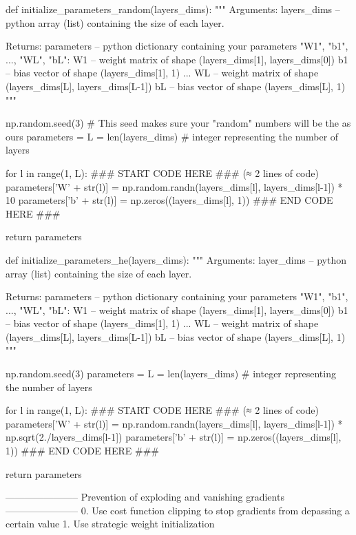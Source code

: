 \documentclass[11pt, onecolumn]{article}
\begin{document}
def initialize_parameters_random(layers_dims):
    """
    Arguments:
    layers_dims -- python array (list) containing the size of each layer.
    
    Returns:
    parameters -- python dictionary containing your parameters "W1", "b1", ..., "WL", "bL":
                    W1 -- weight matrix of shape (layers_dims[1], layers_dims[0])
                    b1 -- bias vector of shape (layers_dims[1], 1)
                    ...
                    WL -- weight matrix of shape (layers_dims[L], layers_dims[L-1])
                    bL -- bias vector of shape (layers_dims[L], 1)
    """
    
    np.random.seed(3)               # This seed makes sure your "random" numbers will be the as ours
    parameters = {}
    L = len(layers_dims)            # integer representing the number of layers
    
    for l in range(1, L):
        ### START CODE HERE ### (≈ 2 lines of code)
        parameters['W' + str(l)] = np.random.randn(layers_dims[l], layers_dims[l-1]) * 10
        parameters['b' + str(l)] = np.zeros((layers_dims[l], 1))
        ### END CODE HERE ###

    return parameters
    
def initialize_parameters_he(layers_dims):
    """
    Arguments:
    layer_dims -- python array (list) containing the size of each layer.
    
    Returns:
    parameters -- python dictionary containing your parameters "W1", "b1", ..., "WL", "bL":
                    W1 -- weight matrix of shape (layers_dims[1], layers_dims[0])
                    b1 -- bias vector of shape (layers_dims[1], 1)
                    ...
                    WL -- weight matrix of shape (layers_dims[L], layers_dims[L-1])
                    bL -- bias vector of shape (layers_dims[L], 1)
    """
    
    np.random.seed(3)
    parameters = {}
    L = len(layers_dims) # integer representing the number of layers
     
    for l in range(1, L):
        ### START CODE HERE ### (≈ 2 lines of code)
        parameters['W' + str(l)] = np.random.randn(layers_dims[l], layers_dims[l-1]) * np.sqrt(2./layers_dims[l-1])
        parameters['b' + str(l)] = np.zeros((layers_dims[l], 1))
        ### END CODE HERE ###
        
    return parameters

-----------------------
Prevention of exploding and vanishing gradients
-----------------------
0. Use cost function clipping to stop gradients from depassing a certain value
1. Use strategic weight initialization
\end{document}
